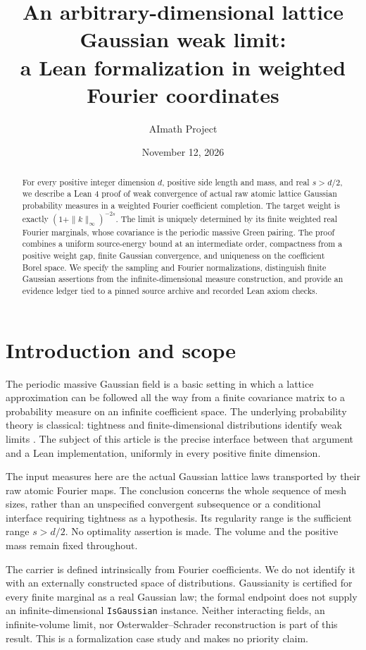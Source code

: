 \documentclass[11pt]{amsart}
\title[An arbitrary-dimensional lattice Gaussian limit]{An arbitrary-dimensional lattice Gaussian weak limit:\\a Lean formalization in weighted Fourier coordinates}
\author{AImath Project}
\date{November 12, 2026}
\theoremstyle{remark}\newtheorem{remark}[theorem]{Remark}
\begin{document}
\begin{abstract}
For every positive integer dimension $d$, positive side length and mass, and real $s>d/2$, we describe a Lean 4 proof of weak convergence of actual raw atomic lattice Gaussian probability measures in a weighted Fourier coefficient completion. The target weight is exactly $(1+\|k\|_\infty)^{-2s}$. The limit is uniquely determined by its finite weighted real Fourier marginals, whose covariance is the periodic massive Green pairing. The proof combines a uniform source-energy bound at an intermediate order, compactness from a positive weight gap, finite Gaussian convergence, and uniqueness on the coefficient Borel space. We specify the sampling and Fourier normalizations, distinguish finite Gaussian assertions from the infinite-dimensional measure construction, and provide an evidence ledger tied to a pinned source archive and recorded Lean axiom checks.
\end{abstract}
\maketitle

\section{Introduction and scope}
The periodic massive Gaussian field is a basic setting in which a lattice approximation can be followed all the way from a finite covariance matrix to a probability measure on an infinite coefficient space. The underlying probability theory is classical: tightness and finite-dimensional distributions identify weak limits \cite{Billingsley,Bogachev}. The subject of this article is the precise interface between that argument and a Lean implementation, uniformly in every positive finite dimension.

The input measures here are the actual Gaussian lattice laws transported by their raw atomic Fourier maps. The conclusion concerns the whole sequence of mesh sizes, rather than an unspecified convergent subsequence or a conditional interface requiring tightness as a hypothesis. Its regularity range is the sufficient range $s>d/2$. No optimality assertion is made. The volume and the positive mass remain fixed throughout.

The carrier is defined intrinsically from Fourier coefficients. We do not identify it with an externally constructed space of distributions. Gaussianity is certified for every finite marginal as a real Gaussian law; the formal endpoint does not supply an infinite-dimensional \texttt{IsGaussian} instance. Neither interacting fields, an infinite-volume limit, nor Osterwalder--Schrader reconstruction is part of this result. This is a formalization case study and makes no priority claim.
\end{document}
